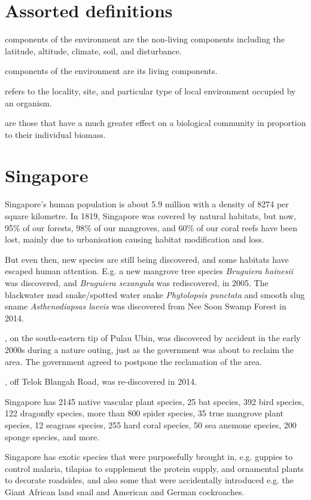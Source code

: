 \documentclass{slnotes}
\newcommand{\scn}[1]{\textit{#1}}
\begin{document}
\chapter{Assorted definitions}
 components of the environment are the non-living components including the latitude, altitude, climate, soil, and disturbance.

 components of the environment are its living components.

 refers to the locality, site, and particular type of local environment occupied by an organism.

 are those that have a much greater effect on a biological community in proportion to their individual biomass.
\chapter{Singapore}
Singapore's human population is about 5.9 million with a density of 8274 per square kilometre. In 1819, Singapore was covered by natural habitats, but now, 95\% of our forests, 98\% of our mangroves, and 60\% of our coral reefs have been lost, mainly due to urbanisation causing habitat modification and loss.

But even then, new species are still being discovered, and some habitats have escaped human attention. E.g. a new mangrove tree species \scn{Bruguiera hainesii} was discovered, and \scn{Bruguiera sexangula} was rediscovered, in 2005. The blackwater mud snake/spotted water snake \scn{Phytolopsis punctata} and smooth slug sname \scn{Asthenodiapsas laevis} was discovered from Nee Soon Swamp Forest in 2014.

, on the south-eastern tip of Pulau Ubin, was discovered by accident in the early 2000s during a nature outing, just as the government was about to reclaim the area. The government agreed to postpone the reclamation of the area.

, off Telok Blangah Road, was re-discovered in 2014.

Singapore has 2145 native vascular plant species, 25 bat species, 392 bird species, 122 dragonfly species, more than 800 spider species, 35 true mangrove plant species, 12 seagrass species, 255 hard coral species, 50 sea anemone species, 200 sponge species, and more.

Singapore has exotic species that were purposefully brought in, e.g. guppies to control malaria, tilapias to supplement the protein supply, and ornamental plants to decorate roadsides, and also some that were accidentally introduced e.g. the Giant African land snail and American and German cockroaches.
\end{document}

